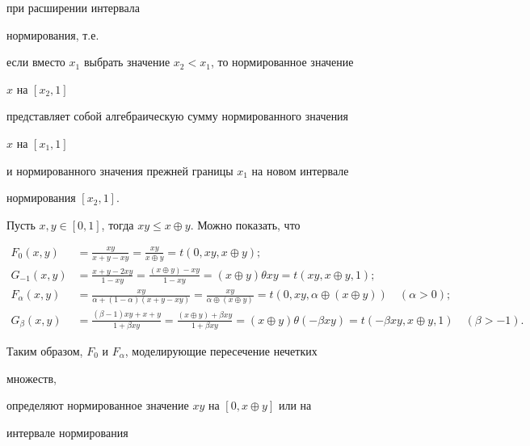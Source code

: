 при расширении интервала


нормирования, т.е.


если вместо $x_1$ выбрать значение $x_2<x_1$, то нормированное значение


$x$ на $[x_2,1]$


представляет собой алгебраическую сумму нормированного значения


$x$ на $[x_1,1]$


и нормированного значения прежней границы $x_1$ на новом интервале


нормирования $[x_2,1]$.





Пусть $x,y\in[0,1]$, тогда $xy\le x\oplus y$. Можно показать, что


\begin{align*}


F_0(x,y)&=\frac{xy}{x+y-xy}=\frac{xy}{x\oplus y}=


t(0,xy,x\oplus y);\\


G_{-1}(x,y)&=\frac{x+y-2xy}{1-xy}=


\frac{(x\oplus y)-xy}{1-xy}=(x\oplus y)\theta xy


=t(xy,x\oplus y,1);\\


F_\alpha(x,y)&=


\frac{xy}{\alpha+(1-\alpha)(x+y-xy)}=


\frac{xy}{\alpha\oplus(x\oplus y)}=


t(0,xy,\alpha\oplus(x\oplus y))\quad (\alpha>0);\\


G_\beta(x,y)&=


\frac{(\beta-1)xy+x+y}{1+\beta xy}=


\frac{(x\oplus y)+\beta xy}{1+\beta xy}=


(x\oplus y)\theta(-\beta xy)=


t(-\beta xy,x\oplus y,1)\quad (\beta>-1).


\end{align*}





Таким образом, $F_0$ и $F_\alpha$, моделирующие пересечение нечетких


множеств,


определяют нормированное значение $xy$ на $[0,x\oplus y]$ или на


интервале нормирования


